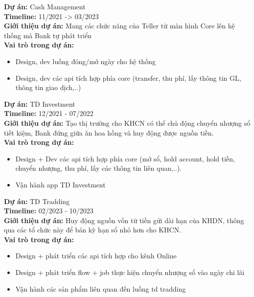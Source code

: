\documentclass[11pt,a4paper,sans]{moderncv}
\begin{document}
\begin{mdframed}[style=ProjectFrame]
	\textbf{Dự án:} Cash Management \\
	\textbf{Timeline:} 11/2021 -> 03/2023 \\
	\textbf{Giới thiệu dự án:}	Mang các chức năng của Teller từ màn hình Core lên hệ thống mà Bank tự phát triển\\
	\textbf{Vai trò trong dự án:}
	\begin{itemize}[leftmargin=0.6cm,noitemsep,topsep=0pt,label=-]
	\item Design, dev luồng đóng/mở ngày cho hệ thống
	\item Design, dev các api tích hợp phía core (transfer, thu phí, lấy thông tin GL, thông tin giao dịch,..)
	\end{itemize}
\end{mdframed}

\begin{mdframed}[style=ProjectFrame]
	\textbf{Dự án:} TD Investment \\
	\textbf{Timeline:} 12/2021 - 07/2022 \\
	\textbf{Giới thiệu dự án:} Tạo thị trường cho KHCN có thể chủ động chuyển nhượng sổ tiết kiệm, Bank đứng giữa ăn hoa hồng và huy động được nguồn tiền.\\
	\textbf{Vai trò trong dự án:}
	\begin{itemize}[leftmargin=0.6cm,noitemsep,topsep=0pt,label=-]
		\item Design + Dev các api tích hợp phía core (mở sổ, hold account, hold tiền, chuyển nhượng, thu phí, lấy các thông tin liên quan,..).
		\item Vận hành app TD Investment
	\end{itemize}
\end{mdframed}

\begin{mdframed}[style=ProjectFrame]
	\textbf{Dự án:} TD Tradding\\
	\textbf{Timeline:} 02/2023 - 10/2023 \\
	\textbf{Giới thiệu dự án:} Huy động nguồn vốn từ tiền gửi dài hạn của KHDN, thông qua các tổ chức này để bán kỳ hạn sổ nhỏ hơn cho KHCN.\\
	\textbf{Vai trò trong dự án:}
	\begin{itemize}[leftmargin=0.6cm,noitemsep,topsep=0pt,label=-]
		\item Design + phát triển các api tích hợp cho kênh Online
		\item Design + phát triển flow + job thực hiện chuyển nhượng sổ vào ngày chi lãi
		\item Vận hành các sản phẩm liên quan đến luồng td tradding
	\end{itemize}
\end{mdframed}
\end{document}
